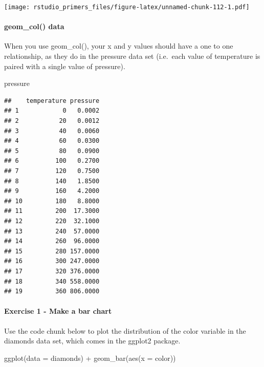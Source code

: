 \documentclass[
]{article}
\newenvironment{Shaded}{\begin{snugshade}}{\end{snugshade}}
\newcommand{\AttributeTok}[1]{\textcolor[rgb]{0.77,0.63,0.00}{#1}}
\newcommand{\FunctionTok}[1]{\textcolor[rgb]{0.00,0.00,0.00}{#1}}
\newcommand{\NormalTok}[1]{#1}
\newcommand{\SpecialCharTok}[1]{\textcolor[rgb]{0.00,0.00,0.00}{#1}}
\begin{document}
\texttt{[image: rstudio\_primers\_files/figure-latex/unnamed-chunk-112-1.pdf]}

\hypertarget{geom_col-data}{%
\paragraph{geom\_col() data}\label{geom_col-data}}

When you use geom\_col(), your x and y values should have a one to one
relationship, as they do in the pressure data set (i.e.~each value of
temperature is paired with a single value of pressure).

\begin{Shaded}
\begin{Highlighting}[]
\NormalTok{pressure}
\end{Highlighting}
\end{Shaded}

\begin{verbatim}
##    temperature pressure
## 1            0   0.0002
## 2           20   0.0012
## 3           40   0.0060
## 4           60   0.0300
## 5           80   0.0900
## 6          100   0.2700
## 7          120   0.7500
## 8          140   1.8500
## 9          160   4.2000
## 10         180   8.8000
## 11         200  17.3000
## 12         220  32.1000
## 13         240  57.0000
## 14         260  96.0000
## 15         280 157.0000
## 16         300 247.0000
## 17         320 376.0000
## 18         340 558.0000
## 19         360 806.0000
\end{verbatim}

\hypertarget{exercise-1---make-a-bar-chart}{%
\paragraph{Exercise 1 - Make a bar
chart}\label{exercise-1---make-a-bar-chart}}

Use the code chunk below to plot the distribution of the color variable
in the diamonds data set, which comes in the ggplot2 package.

\begin{Shaded}
\begin{Highlighting}[]
\FunctionTok{ggplot}\NormalTok{(}\AttributeTok{data =}\NormalTok{ diamonds) }\SpecialCharTok{+}
  \FunctionTok{geom\_bar}\NormalTok{(}\FunctionTok{aes}\NormalTok{(}\AttributeTok{x =}\NormalTok{ color))}
\end{Highlighting}
\end{Shaded}
\end{document}
